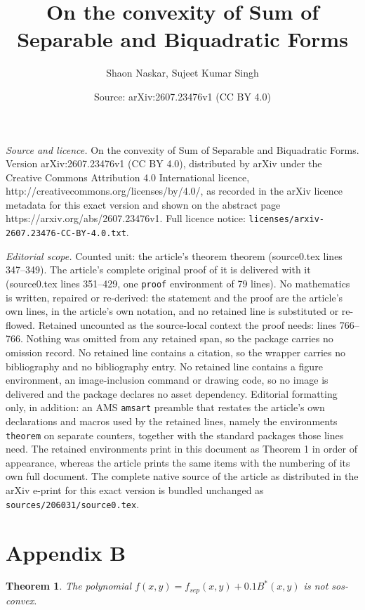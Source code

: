 \documentclass[10pt,a4paper]{amsart}
\title{On the convexity of Sum of Separable and Biquadratic Forms}
\author{Shaon Naskar, Sujeet Kumar Singh}
\date{Source: arXiv:2607.23476v1 (CC BY 4.0)}
\newtheorem{theorem}{Theorem}
\begin{document}
\maketitle

\noindent\emph{Source and licence.} On the convexity of Sum of Separable and Biquadratic Forms. Version arXiv:2607.23476v1 (CC BY 4.0), distributed by arXiv under the Creative Commons Attribution 4.0 International licence, http://creativecommons.org/licenses/by/4.0/, as recorded in the arXiv licence metadata for this exact version and shown on the abstract page https://arxiv.org/abs/2607.23476v1. Full licence notice: \texttt{licenses/arxiv-2607.23476-CC-BY-4.0.txt}.\par\smallskip

\noindent\textit{Editorial scope.} Counted unit: the article's theorem theorem (source0.tex lines 347--349). The article's complete original proof of it is delivered with it (source0.tex lines 351--429, one \texttt{proof} environment of 79 lines). No mathematics is written, repaired or re-derived: the statement and the proof are the article's own lines, in the article's own notation, and no retained line is substituted or re-flowed.  Retained uncounted as the source-local context the proof needs: lines 766--766.  Nothing was omitted from any retained span, so the package carries no omission record.  No retained line contains a citation, so the wrapper carries no bibliography and no bibliography entry.  No retained line contains a figure environment, an image-inclusion command or drawing code, so no image is delivered and the package declares no asset dependency.  Editorial formatting only, in addition: an AMS \texttt{amsart} preamble that restates the article's own declarations and macros used by the retained lines, namely the environments \texttt{theorem} on separate counters, together with the standard packages those lines need.  The retained environments print in this document as Theorem 1 in order of appearance, whereas the article prints the same items with the numbering of its own full document.  The complete native source of the article as distributed in the arXiv e-print for this exact version is bundled unchanged as \texttt{sources/206031/source0.tex}.
\section*{Appendix B}\label{Appendix:B}

\begin{theorem}
    The polynomial $f(x,y) = f_{sep}(x,y) + 0.1 B^*(x,y)$ is not sos-convex.
\end{theorem}
\end{document}
